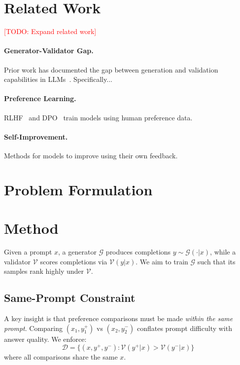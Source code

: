 \documentclass{article}
\newcommand{\todo}[1]{\textcolor{red}{[TODO: #1]}}
\newcommand{\V}{\mathcal{V}}  %
\newcommand{\G}{\mathcal{G}}  %
\begin{document}
\section{Related Work}
\label{sec:related}

\todo{Expand related work}

\paragraph{Generator-Validator Gap.}
Prior work has documented the gap between generation and validation capabilities in LLMs~\citep{west2022symbolic}. Specifically...\citep{li-benchmarking2024,rodriguez2025rankalign}

\paragraph{Preference Learning.}
RLHF~\citep{ouyang2022instructgpt} and DPO~\citep{rafailov2023dpo} train models using human preference data.

\paragraph{Self-Improvement.}
Methods for models to improve using their own feedback.

\section{Problem Formulation}
\label{problem_formulation}

\section{Method}
\label{sec:method}



Given a prompt $x$, a generator $\G$ produces completions $y \sim \G(\cdot | x)$, while a validator $\V$ scores completions via $\V(y | x)$. We aim to train $\G$ such that its samples rank highly under $\V$.

\subsection{Same-Prompt Constraint}

A key insight is that preference comparisons must be made \emph{within the same prompt}. Comparing $(x_1, y_1^+)$ vs $(x_2, y_2^-)$ conflates prompt difficulty with answer quality. We enforce:
\begin{equation}
    \mathcal{D} = \{(x, y^+, y^-) : \V(y^+ | x) > \V(y^- | x)\}
\end{equation}
where all comparisons share the same $x$.
\end{document}
